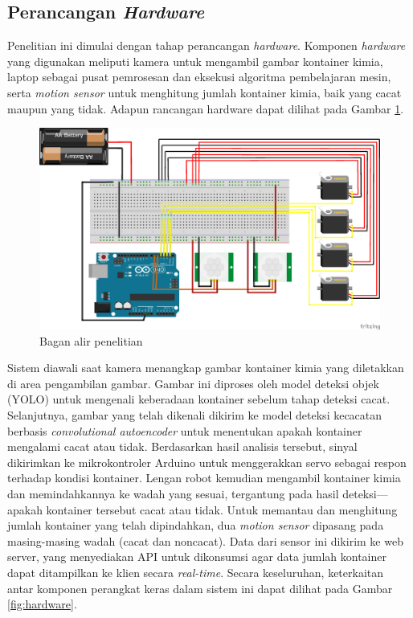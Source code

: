 \vspace{1em}

\subsection{Perancangan \textit{Hardware}}
Penelitian ini dimulai dengan tahap perancangan \textit{hardware}. Komponen
\textit{hardware} yang digunakan meliputi kamera untuk mengambil gambar
kontainer kimia, laptop sebagai pusat pemrosesan dan eksekusi
algoritma pembelajaran mesin, serta \textit{motion sensor} untuk menghitung
jumlah kontainer kimia, baik yang cacat maupun yang tidak. Adapun
rancangan hardware dapat dilihat pada Gambar \ref{fig:rangkaian}.

\begin{figure}[H]
  \centering
  \includegraphics[width=\textwidth]{gambar/rangkaian.png}
  \caption{Bagan alir penelitian}
  \label{fig:rangkaian}
\end{figure}
\vspace{-1em}

Sistem diawali saat kamera menangkap gambar kontainer kimia yang
diletakkan di area pengambilan gambar. Gambar ini diproses oleh model
deteksi objek (YOLO) untuk mengenali keberadaan kontainer sebelum
tahap deteksi cacat. Selanjutnya, gambar yang telah dikenali dikirim
ke model deteksi kecacatan berbasis \textit{convolutional autoencoder} untuk
menentukan apakah kontainer mengalami cacat atau tidak. Berdasarkan
hasil analisis tersebut, sinyal dikirimkan ke mikrokontroler Arduino
untuk menggerakkan servo sebagai respon terhadap kondisi kontainer.
Lengan robot kemudian mengambil kontainer kimia dan memindahkannya ke
wadah yang sesuai, tergantung pada hasil deteksi—apakah kontainer
tersebut cacat atau tidak. Untuk memantau dan menghitung jumlah
kontainer yang telah dipindahkan, dua \textit{motion sensor} dipasang pada
masing-masing wadah (cacat dan noncacat). Data dari sensor ini
dikirim ke web server, yang menyediakan API untuk dikonsumsi agar
data jumlah kontainer dapat ditampilkan ke klien secara \textit{real-time}.
Secara keseluruhan, keterkaitan antar komponen perangkat keras dalam
sistem ini dapat dilihat pada Gambar \ref{fig:hardware}.


